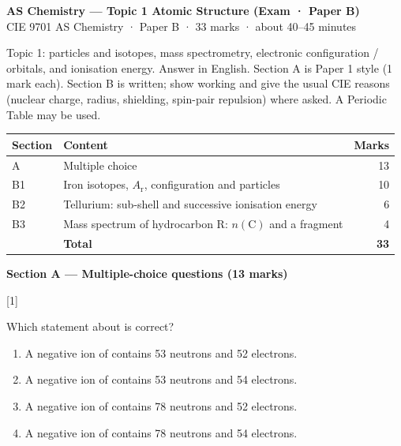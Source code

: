 \documentclass[10pt,a4paper]{article}
\newcommand{\homeworktitle}{Chemistry homework}
\newcommand{\homeworkmarks}{}
\newcommand{\sethomework}[2]{%
  \renewcommand{\homeworktitle}{#1}%
  \renewcommand{\homeworkmarks}{#2}%
}
\newcommand{\qhead}[2]{%
  \par\vspace{0.28em}%
  \Needspace{4.2em}%
  \noindent{\small\textbf{#1}}\hfill{\small[#2]}\par\vspace{0.08em}%
}
\begin{document}
\sethomework{AS Chemistry --- Topic 1 Atomic Structure (Exam · Paper B)}{33 marks}

\begin{center}
{\large\bfseries AS Chemistry --- Topic 1 Atomic Structure (Exam · Paper B)}\\[0.12em]
{\small CIE 9701 AS Chemistry · Paper B · 33 marks · about 40--45 minutes}
\end{center}

{\small Topic 1: particles and isotopes, mass spectrometry, electronic configuration / orbitals, and ionisation energy.
Answer in English. Section A is Paper 1 style (1 mark each). Section B is written; show working and give the usual CIE reasons (nuclear charge, radius, shielding, spin-pair repulsion) where asked. A Periodic Table may be used.}

\vspace{0.15em}
{\small
\begin{tabular}{@{}llr@{}}
\toprule
\textbf{Section} & \textbf{Content} & \textbf{Marks} \\
\midrule
A & Multiple choice & 13 \\
B1 & Iron isotopes, $A_\mathrm{r}$, configuration and particles & 10 \\
B2 & Tellurium: sub-shell and successive ionisation energy & 6 \\
B3 & Mass spectrum of hydrocarbon R: $n(\mathrm{C})$ and a fragment & 4 \\
\midrule
 & \textbf{Total} & \textbf{33} \\
\bottomrule
\end{tabular}}

\vspace{0.30em}
{\large\bfseries Section A --- Multiple-choice questions (13 marks)}\par

\qhead{A1.}{1}
{\small Which statement about  is correct?}
\begin{enumerate}[label=\textbf{\Alph*}, leftmargin=1.7em, itemsep=0.08em]
\item A negative ion of  contains 53 neutrons and 52 electrons.
\item A negative ion of  contains 53 neutrons and 54 electrons.
\item A negative ion of  contains 78 neutrons and 52 electrons.
\item A negative ion of  contains 78 neutrons and 54 electrons.
\end{enumerate}
\end{document}
